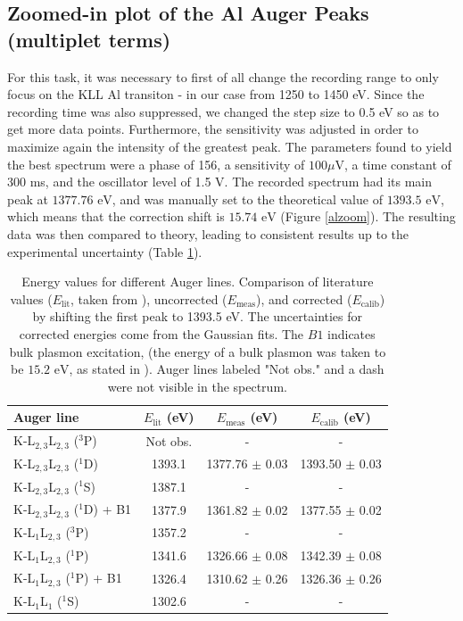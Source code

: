 \documentclass[12pt]{article}
\begin{document}
\subsection{Zoomed-in plot of the Al Auger Peaks (multiplet terms)}
For this task, it was necessary to first of all change the recording range to only focus on the KLL Al transiton - in our case from 1250 to 1450 eV. %
Since the recording time was also suppressed, we changed the step size to 0.5 eV so as to get more data points.
Furthermore, the sensitivity was adjusted in order to maximize again the intensity of the greatest peak.
The parameters found to yield the best spectrum were a phase of 156\degree, a sensitivity of $100 \mu $V, a time constant of 300 ms, and the oscillator level of 1.5 V.
The recorded spectrum had its main peak at $1377.76\text{ eV}$, and was manually set to the theoretical value of $1393.5\text{ eV}$, which means that the correction shift is $15.74 \text{ eV}$ (Figure \ref{alzoom}). The resulting data was then compared to theory, leading to consistent results up to the experimental uncertainty (Table \ref{tab:transition_exp}).

\begin{table}[h!]
    \centering
    \begin{tabular}{lccc}
        \toprule
        \textbf{Auger line} & \textbf{\(E_{\text{lit}}\) (eV)} & \textbf{\(E_{\text{meas}}\) (eV)} & \textbf{\(E_{\text{calib}}\) (eV)} \\
        \midrule
        K-L$_{2,3}$L$_{2,3}$ ($^{3}$P) & Not obs. & - & - \\
        K-L$_{2,3}$L$_{2,3}$ ($^{1}$D) & 1393.1 & 1377.76 $\pm$ 0.03 & 1393.50 $\pm$ 0.03 \\
        K-L$_{2,3}$L$_{2,3}$ ($^{1}$S) & 1387.1 & - & - \\
        K-L$_{2,3}$L$_{2,3}$ ($^{1}$D) + B1 & 1377.9 & 1361.82 $\pm$ 0.02 & 1377.55 $\pm$ 0.02 \\
        K-L$_{1}$L$_{2,3}$ ($^{3}$P) & 1357.2 & - & - \\
        K-L$_{1}$L$_{2,3}$ ($^{1}$P) & 1341.6 & 1326.66 $\pm$ 0.08 & 1342.39 $\pm$ 0.08 \\
        K-L$_{1}$L$_{2,3}$ ($^{1}$P) + B1 & 1326.4 & 1310.62 $\pm$ 0.26 & 1326.36 $\pm$ 0.26 \\
        K-L$_{1}$L$_{1}$ ($^{1}$S) & 1302.6 & - & - \\
        \bottomrule
    \end{tabular}
    \caption{Energy values for different Auger lines. Comparison of literature values (\(E_{\text{lit}}\), taken from \cite{palmberg1991handbook}), uncorrected (\(E_{\text{meas}}\)), and corrected (\(E_{\text{calib}}\)) by shifting the first peak to 1393.5 eV. The uncertainties for corrected energies come from the Gaussian fits. The $B1$ indicates bulk plasmon excitation, (the energy of a bulk plasmon was taken to be $15.2 \text{ eV}$, as stated in \cite{dufor}). Auger lines labeled "Not obs." and a dash were not visible in the spectrum.}
    \label{tab:transition_exp}
\end{table}
\end{document}

